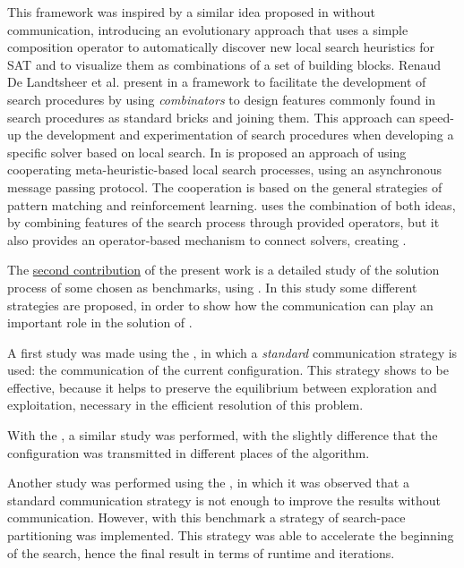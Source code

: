 This framework was inspired by a similar idea proposed in \cite{Fukunaga2008} without communication, introducing an evolutionary approach that uses a simple composition operator to automatically discover new local search heuristics for SAT and to  visualize them as combinations of a set of building blocks. Renaud De Landtsheer et al. present in \cite{Landtsheer2015} a framework to facilitate the development of search procedures by using \textit{combinators} to design features commonly found in search procedures as standard bricks and joining them. This approach can speed-up the development and experimentation of search procedures when developing a specific solver based on local search. In \cite{Martin2016} is proposed an approach of using cooperating meta-heuristic-based local search processes, using an asynchronous message passing protocol. The cooperation is based on the general strategies of pattern matching and reinforcement learning. \posl{} uses the combination of both ideas, by combining features of the search process through provided operators, but it also provides an operator-based mechanism to connect solvers, creating \comstrs.


The \underline{second contribution} of the present work is a detailed study of the solution process of some \CSPs{} chosen as benchmarks, using \posl{}. In this study some different strategies are proposed, in order to show how the communication can play an important role in the solution of \csps{}.

A first study was made using the \sgp{}, in which a \textit{standard} communication strategy is used: the communication of the current configuration. This strategy shows to be effective, because it helps to preserve the equilibrium between exploration and exploitation, necessary in the efficient resolution of this problem.

With the \carrp{}, a similar study was performed, with the slightly difference that the configuration was transmitted in different places of the algorithm.

Another study was performed using the \nqp{}, in which it was observed that a standard communication strategy is not enough to improve the results without communication. However, with this benchmark a strategy of search-pace partitioning was implemented. This strategy was able to accelerate the beginning of the search, hence the final result in terms of runtime and iterations.

